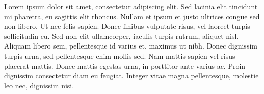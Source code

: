 Lorem ipsum dolor sit amet, consectetur adipiscing elit. Sed lacinia elit tincidunt mi pharetra, eu sagittis elit rhoncus. Nullam et ipsum et justo ultrices congue sed non libero. Ut nec felis sapien. Donec finibus vulputate risus, vel laoreet turpis sollicitudin eu. Sed non elit ullamcorper, iaculis turpis rutrum, aliquet nisl. Aliquam libero sem, pellentesque id varius et, maximus ut nibh. Donec dignissim turpis urna, sed pellentesque enim mollis sed. Nam mattis sapien vel risus placerat mattis. Donec mattis egestas urna, in porttitor ante varius ac. Proin dignissim consectetur diam eu feugiat. Integer vitae magna pellentesque, molestie leo nec, dignissim nisi. 